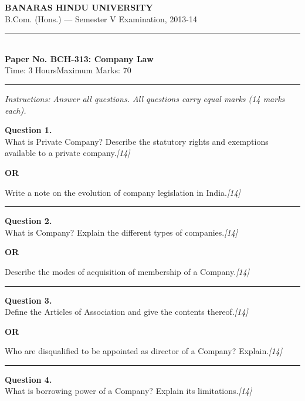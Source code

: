 \documentclass[11pt,a4paper]{article}
\newcommand{\pts}[1]{\hfill   \textit{[#1]}}
\begin{document}
\begin{center}
  {\large\bfseries BANARAS HINDU UNIVERSITY}\\[2pt]
  {\normalsize B.Com. (Hons.) --- Semester V Examination, 2013-14}\\[6pt]
  \rule{0.8\linewidth}{0.5pt}\\[6pt]
  {\large\bfseries Paper No. BCH-313: Company Law}\\[4pt]
  {\normalsize Time: 3 Hours\hfill Maximum Marks: 70}
\end{center}

\rule{\linewidth}{0.4pt}

\smallskip



\noindent   \textit{Instructions: Answer all questions. All questions carry equal marks (14 marks each).}

\bigskip




\noindent   \textbf{Question 1.} \\
What is Private Company? Describe the statutory rights and exemptions available to a private company.\pts{14}

\centerline{   \textbf{OR}}

Write a note on the evolution of company legislation in India.\pts{14}

\medskip\rule{\linewidth}{0.2pt}




\noindent   \textbf{Question 2.} \\
What is Company? Explain the different types of companies.\pts{14}

\centerline{   \textbf{OR}}

Describe the modes of acquisition of membership of a Company.\pts{14}

\medskip\rule{\linewidth}{0.2pt}

\pagebreak




\noindent   \textbf{Question 3.} \\
Define the Articles of Association and give the contents thereof.\pts{14}

\centerline{   \textbf{OR}}

Who are disqualified to be appointed as director of a Company? Explain.\pts{14}

\medskip\rule{\linewidth}{0.2pt}




\noindent   \textbf{Question 4.} \\
What is borrowing power of a Company? Explain its limitations.\pts{14}
\end{document}
